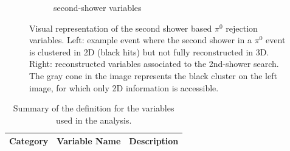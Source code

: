 \begin{figure}[H]
\begin{center}
\begin{subfigure}[b]{0.35\textwidth}
    \caption{\label{fig:nue:variables:secondshower}second-shower variables }
    \end{subfigure}
\caption{\label{fig:nue:variables:secondshower} Visual representation of the second shower based $\pi^0$ rejection variables. Left: example event where the second shower in a $\pi^0$ event is clustered in 2D (black hits) but not fully reconstructed in 3D. Right: reconstructed variables associated to the 2nd-shower search. The gray cone in the image represents the black cluster on the left image, for which only 2D information is accessible.}
\end{center}
\end{figure}

\begin{table}[ht]
\caption{\label{tab:variableSummary} Summary of the definition for the variables used in the analysis.}
\centering
\begin{tabular}{ m{} | m{} | m{}  }
Category & Variable Name & Description  \\
\hline


\end{tabular}
\end{table}
